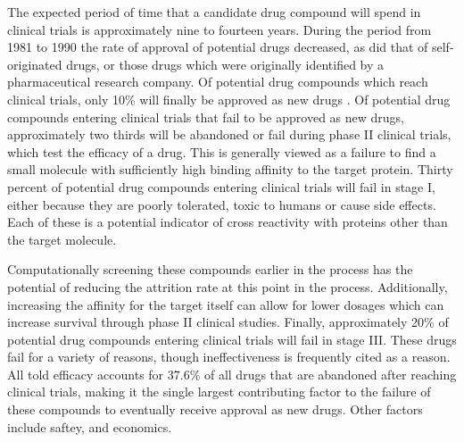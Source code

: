 The expected period of time that a candidate drug compound will spend in clinical trials is approximately nine to fourteen years\cite{dimasi2003price,paul2010improve}.
During the period from 1981 to 1990 the rate of approval of potential drugs decreased, as did that of self-originated drugs, or those drugs which were originally identified by a pharmaceutical research company.
Of potential drug compounds which reach clinical trials, only 10\% will finally be approved as new drugs \cite{dimasi2001risks,paul2010improve}.
Of potential drug compounds entering clinical trials that fail to be approved as new drugs, approximately two thirds will be abandoned or fail during phase II clinical trials, which test the efficacy of a drug.
This is generally viewed as a failure to find a small molecule with sufficiently high binding affinity to the target protein.
Thirty percent of potential drug compounds entering clinical trials will fail in stage I, either because they are poorly tolerated, toxic to humans or cause side effects.
Each of these is a potential indicator of cross reactivity with proteins other than the target molecule.

Computationally screening these compounds earlier in the process has the potential of reducing the attrition rate at this point in the process.
Additionally, increasing the affinity for the target itself can allow for lower dosages which can increase survival through phase II clinical studies.
Finally, approximately 20\% of potential drug compounds entering clinical trials will fail in stage III.
These drugs fail for a variety of reasons, though ineffectiveness is frequently cited as a reason.
All told efficacy accounts for 37.6\% of all drugs that are abandoned after reaching clinical trials, making it the single largest contributing factor to the failure of these compounds to eventually receive approval as new drugs.
Other factors include saftey, and economics.
\cite{dimasi2001risks}

